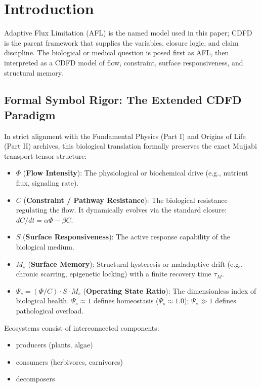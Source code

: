 \documentclass[11pt]{article}
\begin{document}
\section{Introduction}

Adaptive Flux Limitation (AFL) is the named model used in this paper; CDFD is the parent framework that supplies the variables, closure logic, and claim discipline. The biological or medical question is posed first as AFL, then interpreted as a CDFD model of flow, constraint, surface responsiveness, and structural memory.

\subsection{Formal Symbol Rigor: The Extended CDFD Paradigm}
In strict alignment with the Fundamental Physics (Part I) and Origins of Life (Part II) archives, this biological translation formally preserves the exact Mujjabi transport tensor structure:
\begin{itemize}
    \item $\Phi$ (\textbf{Flow Intensity}): The physiological or biochemical drive (e.g., nutrient flux, signaling rate).
    \item $C$ (\textbf{Constraint / Pathway Resistance}): The biological resistance regulating the flow. It dynamically evolves via the standard closure: $dC/dt = \alpha \Phi - \beta C$.
    \item $S$ (\textbf{Surface Responsiveness}): The active response capability of the biological medium.
    \item $M_s$ (\textbf{Surface Memory}): Structural hysteresis or maladaptive drift (e.g., chronic scarring, epigenetic locking) with a finite recovery time $\tau_M$.
    \item $\Psi_s = (\Phi/C) \cdot S \cdot M_s$ (\textbf{Operating State Ratio}): The dimensionless index of biological health. $\Psi_s \approx 1$ defines homeostasis ($\Psi_s \approx 1.0$); $\Psi_s \gg 1$ defines pathological overload.
\end{itemize}


Ecosystems consist of interconnected components:

\begin{itemize}
    \item producers (plants, algae)
    \item consumers (herbivores, carnivores)
    \item decomposers
\end{itemize}
\end{document}
